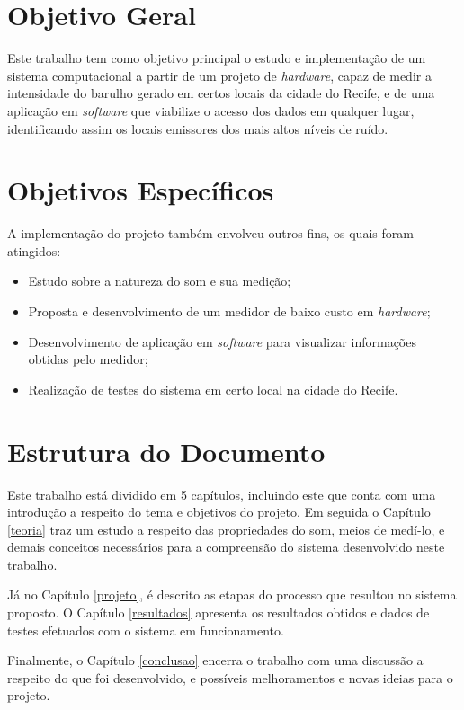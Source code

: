\documentclass[
    12pt,               %
    openright,          %
    oneside,
    a4paper,            
    english,            %
    brazil              %
    ]{abntex2}
\begin{document}
\section{Objetivo Geral}\label{geral}

Este trabalho tem como objetivo principal o estudo e implementação de um sistema computacional a partir de um projeto de \textit{hardware}, capaz de medir a intensidade do barulho gerado em certos locais da cidade do Recife, e de uma aplicação em \textit{software} que viabilize o acesso dos dados em qualquer lugar, identificando assim os locais emissores dos mais altos níveis de ruído.

\section{Objetivos Específicos}\label{especificos}

A implementação do projeto também envolveu outros fins, os quais foram atingidos:

  \begin{itemize}
    \item Estudo sobre a natureza do som e sua medição;
    \item Proposta e desenvolvimento de um medidor de baixo custo em \textit{hardware};
    \item Desenvolvimento de aplicação em \textit{software} para visualizar informações obtidas pelo medidor;
    \item Realização de testes do sistema em certo local na cidade do Recife. 
  \end{itemize}

\section{Estrutura do Documento}\label{estrutura}

Este trabalho está dividido em 5 capítulos, incluindo este que conta com uma introdução a respeito do tema e objetivos do projeto. Em seguida o Capítulo \ref{teoria} traz um estudo a respeito das propriedades do som, meios de medí-lo, e demais conceitos necessários para a compreensão do sistema desenvolvido neste trabalho. 

Já no Capítulo \ref{projeto}, é descrito as etapas do processo que resultou no sistema proposto. O Capítulo \ref{resultados} apresenta os resultados obtidos e dados de testes efetuados com o sistema em funcionamento. 

Finalmente, o Capítulo \ref{conclusao} encerra o trabalho com uma discussão a respeito do que foi desenvolvido, e possíveis melhoramentos e novas ideias para o projeto.
\end{document}
